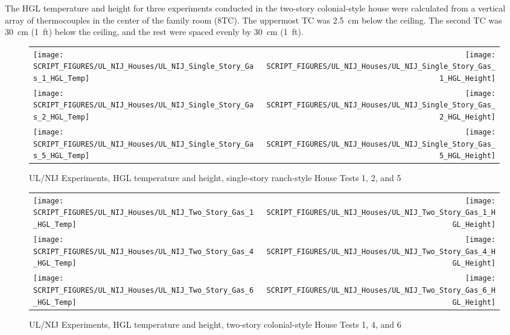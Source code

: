 The HGL temperature and height for three experiments conducted in the two-story colonial-style house were calculated from a vertical array of thermocouples in the center of the family room (8TC). The uppermost TC was 2.5~cm below the ceiling. The second TC was 30~cm (1~ft) below the ceiling, and the rest were spaced evenly by 30~cm (1~ft).

\newpage

\begin{figure}[p]
\begin{tabular*}{\textwidth}{l@{\extracolsep{\fill}}r}
\texttt{[image: SCRIPT\_FIGURES/UL\_NIJ\_Houses/UL\_NIJ\_Single\_Story\_Gas\_1\_HGL\_Temp]} &
\texttt{[image: SCRIPT\_FIGURES/UL\_NIJ\_Houses/UL\_NIJ\_Single\_Story\_Gas\_1\_HGL\_Height]} \\
\texttt{[image: SCRIPT\_FIGURES/UL\_NIJ\_Houses/UL\_NIJ\_Single\_Story\_Gas\_2\_HGL\_Temp]} &
\texttt{[image: SCRIPT\_FIGURES/UL\_NIJ\_Houses/UL\_NIJ\_Single\_Story\_Gas\_2\_HGL\_Height]} \\
\texttt{[image: SCRIPT\_FIGURES/UL\_NIJ\_Houses/UL\_NIJ\_Single\_Story\_Gas\_5\_HGL\_Temp]} &
\texttt{[image: SCRIPT\_FIGURES/UL\_NIJ\_Houses/UL\_NIJ\_Single\_Story\_Gas\_5\_HGL\_Height]} \\
\end{tabular*}
\caption[UL/NIJ Experiments, HGL temperature and height, Tests 1, 2, and 5]{UL/NIJ Experiments, HGL temperature and height, single-story ranch-style House Tests 1, 2, and 5}
\label{UL_NIJ_HGL_1}
\end{figure}

\begin{figure}[p]
\begin{tabular*}{\textwidth}{l@{\extracolsep{\fill}}r}
\texttt{[image: SCRIPT\_FIGURES/UL\_NIJ\_Houses/UL\_NIJ\_Two\_Story\_Gas\_1\_HGL\_Temp]} &
\texttt{[image: SCRIPT\_FIGURES/UL\_NIJ\_Houses/UL\_NIJ\_Two\_Story\_Gas\_1\_HGL\_Height]} \\
\texttt{[image: SCRIPT\_FIGURES/UL\_NIJ\_Houses/UL\_NIJ\_Two\_Story\_Gas\_4\_HGL\_Temp]} &
\texttt{[image: SCRIPT\_FIGURES/UL\_NIJ\_Houses/UL\_NIJ\_Two\_Story\_Gas\_4\_HGL\_Height]} \\
\texttt{[image: SCRIPT\_FIGURES/UL\_NIJ\_Houses/UL\_NIJ\_Two\_Story\_Gas\_6\_HGL\_Temp]} &
\texttt{[image: SCRIPT\_FIGURES/UL\_NIJ\_Houses/UL\_NIJ\_Two\_Story\_Gas\_6\_HGL\_Height]} \\
\end{tabular*}
\caption[UL/NIJ Experiments, HGL temperature and height, Tests 1, 4, and 6]{UL/NIJ Experiments, HGL temperature and height, two-story colonial-style House Tests 1, 4, and 6}
\label{UL_NIJ_HGL_2}
\end{figure}

